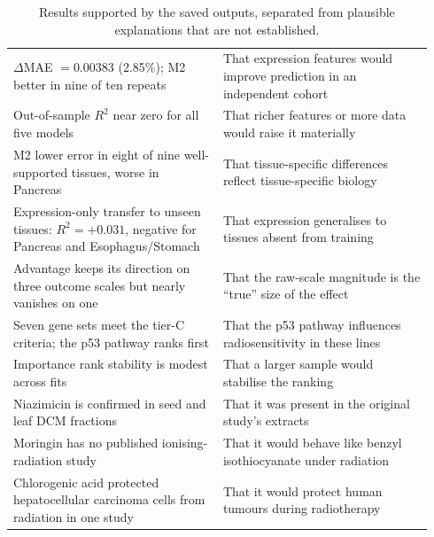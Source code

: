 \begin{table}[tbp]
  \caption{Results supported by the saved outputs, separated from plausible explanations
    that are not established.}\label{tab:supported}
  \small
  \begin{tabular}{@{}L{0.47\linewidth}L{0.47\linewidth}@{}}
    \toprule
     &  \\
    \midrule
    $\Delta$MAE $=0.00383$ (2.85\%); M2 better in nine of ten repeats
      & That expression features would improve prediction in an independent cohort \\
    Out-of-sample $R^2$ near zero for all five models
      & That richer features or more data would raise it materially \\
    M2 lower error in eight of nine well-supported tissues, worse in Pancreas
      & That tissue-specific differences reflect tissue-specific biology \\
    Expression-only transfer to unseen tissues: $R^2=+0.031$, negative for Pancreas and
      Esophagus/Stomach & That expression generalises to tissues absent from training \\
    Advantage keeps its direction on three outcome scales but nearly vanishes on one
      & That the raw-scale magnitude is the \enquote{true} size of the effect \\
    Seven gene sets meet the tier-C criteria; the p53 pathway ranks first
      & That the p53 pathway influences radiosensitivity in these lines \\
    Importance rank stability is modest across fits
      & That a larger sample would stabilise the ranking \\
    Niazimicin is confirmed in seed and leaf DCM fractions
      & That it was present in the original study's extracts \\
    Moringin has no published ionising-radiation study
      & That it would behave like benzyl isothiocyanate under radiation \\
    Chlorogenic acid protected hepatocellular carcinoma cells from radiation in one study
      & That it would protect human tumours during radiotherapy \\
    \bottomrule
  \end{tabular}
\end{table}
